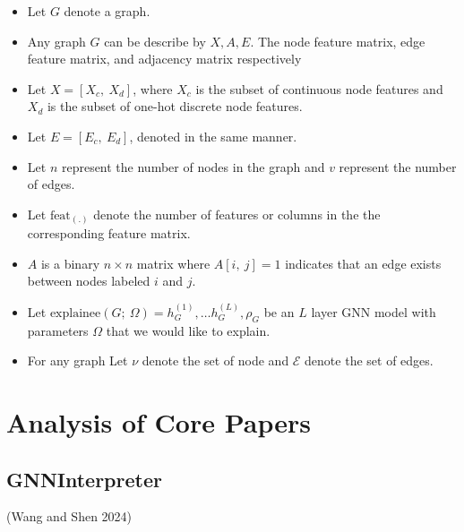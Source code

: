 \documentclass[
  11pt,
  letterpaper,
]{article}
\begin{document}
\begin{itemize}
\item
  Let \(G\) denote a graph.
\item
  Any graph \(G\) can be describe by \(X, A, E\). The node feature
  matrix, edge feature matrix, and adjacency matrix respectively
\item
  Let \(X = [X_c, \ X_d]\), where \(X_c\) is the subset of continuous
  node features and \(X_d\) is the subset of one-hot discrete node
  features.
\item
  Let \(E = [E_c, \ E_d]\), denoted in the same manner.
\item
  Let \(n\) represent the number of nodes in the graph and \(v\)
  represent the number of edges.
\item
  Let \(\text{feat}_{(.)}\) denote the number of features or columns in
  the the corresponding feature matrix.
\item
  \(A\) is a binary \(n \times n\) matrix where \(A[i, \ j] = 1\)
  indicates that an edge exists between nodes labeled \(i\) and \(j\).
\item
  Let
  \(\text{explainee}(G; \ \Omega) = h^{(1)}_G, \dots h^{(L)}_G, \rho_G\)
  be an \(L\) layer GNN model with parameters \(\Omega\) that we would
  like to explain.
\item
  For any graph Let \(\nu\) denote the set of node and \(\mathcal{E}\)
  denote the set of edges.
\end{itemize}

\hypertarget{analysis-of-core-papers}{%
\section{Analysis of Core Papers}\label{analysis-of-core-papers}}

\hypertarget{gnninterpreter}{%
\subsection{GNNInterpreter}\label{gnninterpreter}}

(Wang and Shen 2024)
\end{document}

